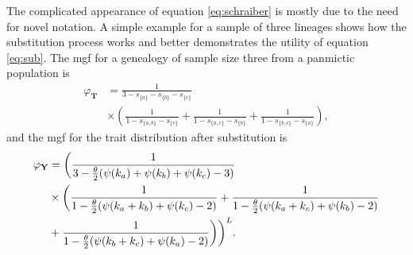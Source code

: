 The complicated appearance of equation \eqref{eq:schraiber} is mostly due to the
need for novel notation. A simple example for a sample of three lineages shows
how the substitution process works and better demonstrates the utility of
equation \eqref{eq:sub}. The mgf for a genealogy of sample size three from a
panmictic population is
\begin{align*}
  \varphi_{\mathbf{T}} &= \frac{1}{3 - s_{\{a\}} - s_{\{b\}} - s_{\{c\}}} \\
  &\times \left( \frac{1}{1 - s_{\{a,b\}} - s_{\{c\}}} + \frac{1}{1 - s_{\{a,c\}} - s_{\{b\}}}  + \frac{1}{1 - s_{\{b,c\}} - s_{\{a\}}}\right),
    \end{align*}
and the mgf for the trait distribution after substitution is
\begin{align*}
  \varphi_{\mathbf{Y}} &= \biggl(\frac{1}{3 - \frac{\theta}{2}(\psi(k_a) + \psi(k_b) + \psi(k_c) - 3)} \\
  &\times \biggl( \frac{1}{1 - \frac{\theta}{2}(\psi(k_a+k_b) + \psi(k_c) - 2)} +
  \frac{1}{1 - \frac{\theta}{2}(\psi(k_a+k_c) + \psi(k_b) - 2)} \\
  &+\frac{1}{1 - \frac{\theta}{2}(\psi(k_b+k_c) + \psi(k_a) - 2)}\biggr)
  \biggr)^L.
\end{align*}

